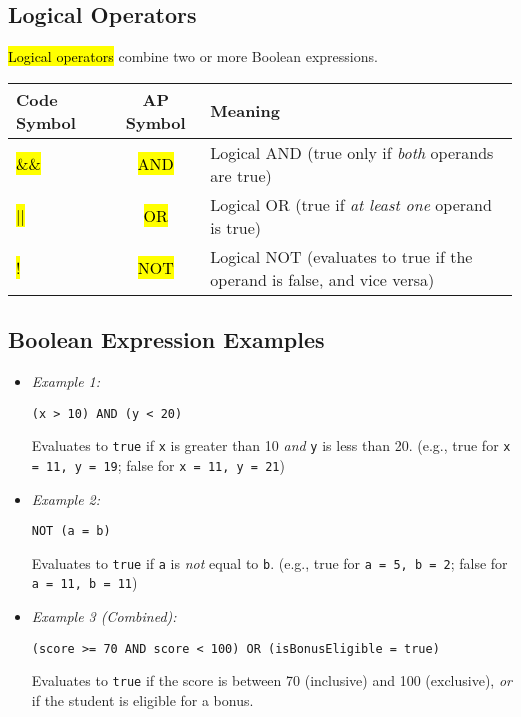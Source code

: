 \documentclass[11pt,oneside]{book}
\newcommand{\hlc}[2][hlyellow]{\sethlcolor{#1}\hl{#2}}
\begin{document}
\subsection*{Logical Operators}
\hlc[hlred]{Logical operators} combine two or more Boolean expressions.

\begin{tabularx}{\textwidth}{>{\ttfamily}l >{\ttfamily}c X}
\toprule
\textbf{Code Symbol} & \textbf{AP Symbol} & \textbf{Meaning} \\
\midrule
\hlc[hlred]{\&\&} & \hlc[hlred]{AND} & Logical AND (true only if \textit{both} operands are true) \\
\hlc[hlred]{||} & \hlc[hlred]{OR} & Logical OR (true if \textit{at least one} operand is true) \\
\hlc[hlred]{!} & \hlc[hlred]{NOT} & Logical NOT (evaluates to true if the operand is false, and vice versa) \\
\bottomrule
\end{tabularx}

\subsection*{Boolean Expression Examples}
\begin{itemize}
\item \textit{Example 1:}
\begin{lstlisting}[language=APCSP, basicstyle=\ttfamily\small]
(x > 10) AND (y < 20)
\end{lstlisting}
Evaluates to \texttt{true} if \texttt{x} is greater than 10 \textit{and} \texttt{y} is less than 20. (e.g., true for \texttt{x = 11, y = 19}; false for \texttt{x = 11, y = 21})
\item \textit{Example 2:}
\begin{lstlisting}[language=APCSP, basicstyle=\ttfamily\small]
NOT (a = b)
\end{lstlisting}
Evaluates to \texttt{true} if \texttt{a} is \textit{not} equal to \texttt{b}. (e.g., true for \texttt{a = 5, b = 2}; false for \texttt{a = 11, b = 11})
\item \textit{Example 3 (Combined):}
\begin{lstlisting}[language=APCSP, basicstyle=\ttfamily\small]
(score >= 70 AND score < 100) OR (isBonusEligible = true)
\end{lstlisting}
Evaluates to \texttt{true} if the score is between 70 (inclusive) and 100 (exclusive), \textit{or} if the student is eligible for a bonus.
\end{itemize}
\end{document}

